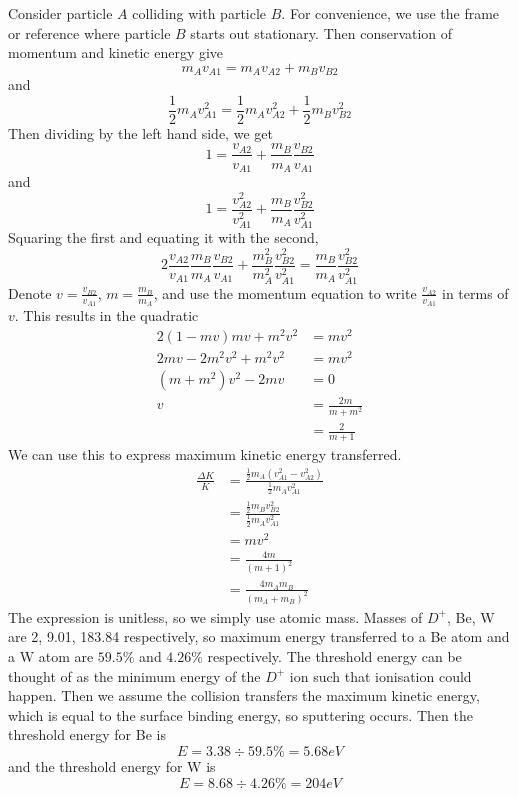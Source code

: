\documentclass[answers]{exam}
\begin{document}
\begin{questions}
\begin{solution}
    Consider particle $A$ colliding with particle $B$. For convenience, we use the frame or reference where particle $B$ starts out stationary. Then conservation of momentum and kinetic energy give
    $$m_Av_{A1} = m_Av_{A2} + m_Bv_{B2}$$
    and
    $$\frac{1}{2} m_Av^2_{A1} = \frac{1}{2} m_Av^2_{A2} + \frac{1}{2} m_Bv^2_{B2}$$
    Then dividing by the left hand side, we get
    $$1 = \frac{v_{A2}}{v_{A1}} + \frac{m_B}{m_A}\frac{v_{B2}}{v_{A1}}$$
    and
    $$1 = \frac{v^2_{A2}}{v^2_{A1}} + \frac{m_B}{m_A}\frac{v^2_{B2}}{v^2_{A1}}$$
    Squaring the first and equating it with the second,
    $$2\frac{v_{A2}}{v_{A1}}\frac{m_B}{m_A}\frac{v_{B2}}{v_{A1}} + \frac{m_B^2}{m_A^2}\frac{v^2_{B2}}{v^2_{A1}} = \frac{m_B}{m_A}\frac{v^2_{B2}}{v^2_{A1}}$$
    Denote $v = \frac{v_{B2}}{v_{A1}}$, $m = \frac{m_B}{m_A}$, and use the momentum equation to write $\frac{v_{A2}}{v_{A1}}$ in terms of $v$. This results in the quadratic
    \begin{align*}
        2(1-mv)mv + m^2v^2 &= mv^2 \\
        2mv - 2m^2v^2 + m^2v^2 &= mv^2 \\
        (m+m^2)v^2 - 2mv &= 0 \\
        v &= \frac{2m}{m+m^2} \\
          &= \frac{2}{m+1}
    \end{align*}
    We can use this to express maximum kinetic energy transferred.
    \begin{align*}
        \frac{\Delta K}{K} &= \frac{\frac{1}{2}m_A(v^2_{A1} - v^2_{A2})}{\frac{1}{2}m_Av^2_{A1}} \\
                           &= \frac{\frac{1}{2}m_Bv^2_{B2}}{\frac{1}{2}m_Av^2_{A1}} \\
                           &= mv^2 \\
                           &= \frac{4m}{(m+1)^2} \\
                           &= \frac{4m_Am_B}{(m_A+m_B)^2}
    \end{align*}
    The expression is unitless, so we simply use atomic mass. Masses of $D^+$, Be, W are 2, 9.01, 183.84 respectively, so maximum energy transferred to a Be atom and a W atom are $59.5\%$ and $4.26\%$ respectively. The threshold energy can be thought of as the minimum energy of the $D^+$ ion such that ionisation could happen. Then we assume the collision transfers the maximum kinetic energy, which is equal to the surface binding energy, so sputtering occurs. Then the threshold energy for Be is
    $$E = 3.38 \div 59.5\% = 5.68 \unit{eV}$$
    and the threshold energy for W is
    $$E = 8.68 \div 4.26\% = 204 \unit{eV}$$
\end{solution}


\end{questions}
\end{document}
